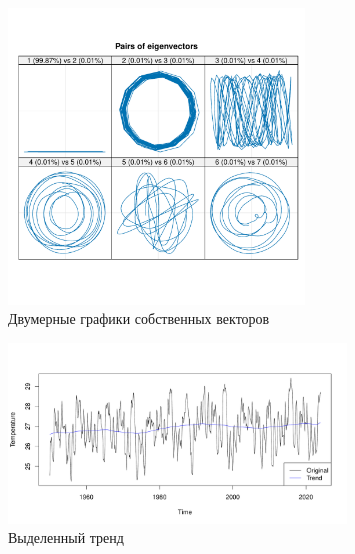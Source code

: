 \documentclass[specialist,
substylefile = spbu.rtx,
               subf,href,colorlinks=true, 12pt]{disser}
\theoremstyle{definition}
\begin{document}
\begin{figure}[h!]
	\centering
	\includegraphics[width=0.7\textwidth]{img/Nino_ssa_paired.pdf}
	\caption{Двумерные графики собственных векторов}
	\label{Nino_ssa_paired}
\end{figure}

\begin{figure}[h!]
	\centering
	\includegraphics[width=0.8\textwidth]{img/Nino_reconstruct_trend.pdf}
	\caption{Выделенный тренд}
	\label{Nino_reconstruct_trend}
\end{figure}
\end{document}
